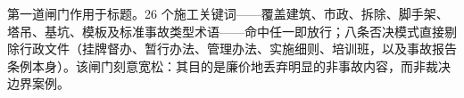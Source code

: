 \documentclass[11pt]{article}
\begin{document}
{\cjkfont 第\allowbreak 一\allowbreak 道\allowbreak 闸\allowbreak 门\allowbreak 作\allowbreak 用\allowbreak 于\allowbreak 标\allowbreak 题\allowbreak 。}26 {\cjkfont 个\allowbreak 施\allowbreak 工\allowbreak 关\allowbreak 键\allowbreak 词}------{\cjkfont 覆\allowbreak 盖\allowbreak 建\allowbreak 筑\allowbreak 、\allowbreak 市\allowbreak 政\allowbreak 、\allowbreak 拆\allowbreak 除\allowbreak 、\allowbreak 脚\allowbreak 手\allowbreak 架\allowbreak 、\allowbreak 塔\allowbreak 吊\allowbreak 、\allowbreak 基\allowbreak 坑\allowbreak 、\allowbreak 模\allowbreak 板\allowbreak 及\allowbreak 标\allowbreak 准\allowbreak 事\allowbreak 故\allowbreak 类\allowbreak 型\allowbreak 术\allowbreak 语}------{\cjkfont 命\allowbreak 中\allowbreak 任\allowbreak 一\allowbreak 即\allowbreak 放\allowbreak 行\allowbreak ；\allowbreak 八\allowbreak 条\allowbreak 否\allowbreak 决\allowbreak 模\allowbreak 式\allowbreak 直\allowbreak 接\allowbreak 剔\allowbreak 除\allowbreak 行\allowbreak 政\allowbreak 文\allowbreak 件\allowbreak （\allowbreak 挂\allowbreak 牌\allowbreak 督\allowbreak 办\allowbreak 、\allowbreak 暂\allowbreak 行\allowbreak 办\allowbreak 法\allowbreak 、\allowbreak 管\allowbreak 理\allowbreak 办\allowbreak 法\allowbreak 、\allowbreak 实\allowbreak 施\allowbreak 细\allowbreak 则\allowbreak 、\allowbreak 培\allowbreak 训\allowbreak 班\allowbreak ，\allowbreak 以\allowbreak 及\allowbreak 事\allowbreak 故\allowbreak 报\allowbreak 告\allowbreak 条\allowbreak 例\allowbreak 本\allowbreak 身\allowbreak ）\allowbreak 。\allowbreak 该\allowbreak 闸\allowbreak 门\allowbreak 刻\allowbreak 意\allowbreak 宽\allowbreak 松\allowbreak ：\allowbreak 其\allowbreak 目\allowbreak 的\allowbreak 是\allowbreak 廉\allowbreak 价\allowbreak 地\allowbreak 丢\allowbreak 弃\allowbreak 明\allowbreak 显\allowbreak 的\allowbreak 非\allowbreak 事\allowbreak 故\allowbreak 内\allowbreak 容\allowbreak ，\allowbreak 而\allowbreak 非\allowbreak 裁\allowbreak 决\allowbreak 边\allowbreak 界\allowbreak 案\allowbreak 例\allowbreak 。}
\end{document}
